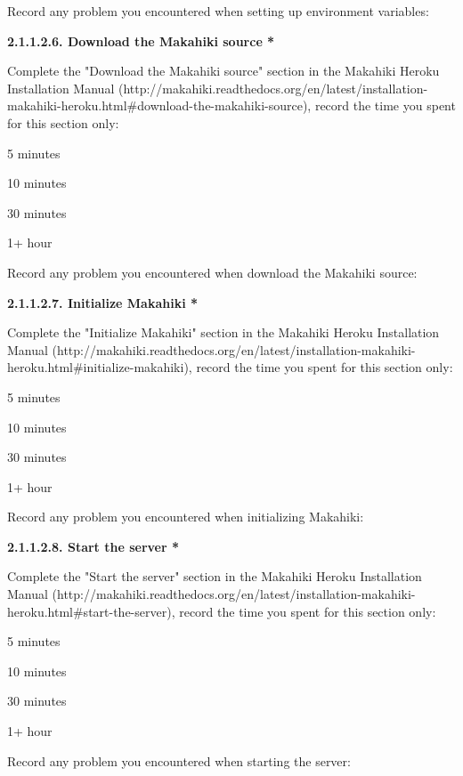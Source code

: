 Record any problem you encountered when setting up environment variables:

{\bf 2.1.1.2.6. Download the Makahiki source *}

Complete the "Download the Makahiki source" section in the Makahiki Heroku Installation Manual (http://makahiki.readthedocs.org/en/latest/installation-makahiki-heroku.html\#download-the-makahiki-source), record the time you spent for this section only:

\begin{compactitem}
\item 5 minutes
\item  10 minutes
\item  30 minutes
\item  1+ hour
\end{compactitem}

Record any problem you encountered when download the Makahiki source:

{\bf 2.1.1.2.7. Initialize Makahiki *}

Complete the "Initialize Makahiki" section in the Makahiki Heroku Installation Manual (http://makahiki.readthedocs.org/en/latest/installation-makahiki-heroku.html\#initialize-makahiki), record the time you spent for this section only:

\begin{compactitem}
\item 5 minutes
\item  10 minutes
\item  30 minutes
\item  1+ hour
\end{compactitem}

Record any problem you encountered when initializing Makahiki:

{\bf 2.1.1.2.8. Start the server *}

Complete the "Start the server" section in the Makahiki Heroku Installation Manual (http://makahiki.readthedocs.org/en/latest/installation-makahiki-heroku.html\#start-the-server), record the time you spent for this section only:

\begin{compactitem}
\item 5 minutes
\item  10 minutes
\item  30 minutes
\item  1+ hour
\end{compactitem}

Record any problem you encountered when starting the server:

